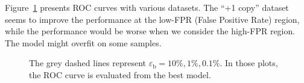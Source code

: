 \documentclass[12pt]{article}
\begin{document}
            Figure~\ref{fig:roc_curve_res_25_75} presents ROC curves with various datasets. The ``+1 copy'' dataset seems to improve the performance at the low-FPR (False Positive Rate) region, while the performance would be worse when we consider the high-FPR region. The model might overfit on some samples.
            \begin{figure}[htpb]
                \centering
                \caption{The grey dashed lines represent $\varepsilon_{\text{b}}=10 \%, 1 \%, 0.1\%$. In those plots, the ROC curve is evaluated from the best model.}
                \label{fig:roc_curve_res_25_75}
            \end{figure}
\end{document}
